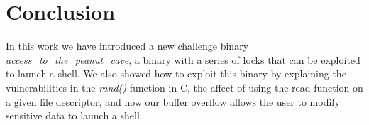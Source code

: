 \section{Conclusion}
In this work we have introduced a new challenge binary \emph{access\_to\_the\_peanut\_cave}, a binary with a series of locks that can be exploited to launch a shell. We also showed how to exploit this binary by explaining the vulnerabilities in the \emph{rand()} function in C, the affect of using the read function on a given file descriptor, and how our buffer overflow allows the user to modify sensitive data to launch a shell. 

